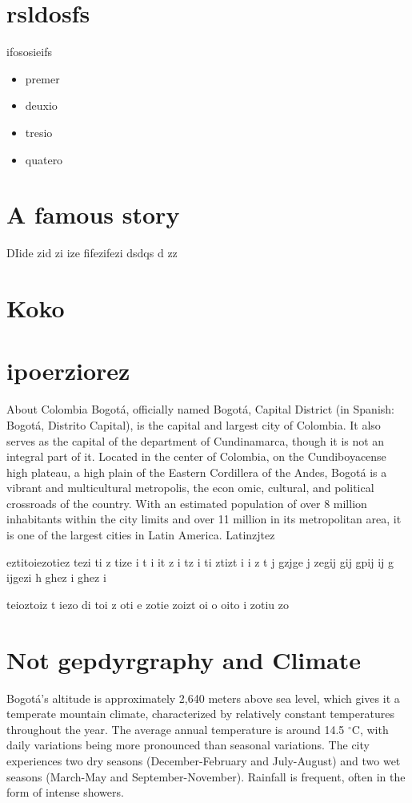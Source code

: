 \documentclass{article}
\begin{document}
\section{rsldosfs}

ifososieifs




\begin{itemize}
    \item premer
    \item deuxio
    \item tresio
    \item quatero
\end{itemize}

\section{A famous story}

DIide zid zi ize
fifezifezi
dsdqs
d
zz

\section{Koko}

\section{ipoerziorez}

About Colombia
Bogotá, officially named Bogotá, Capital District (in Spanish: Bogotá, Distrito Capital), is the capital and largest city of Colombia. It also serves as the capital of the department of Cundinamarca, though it is not an integral part of it. Located in the center of Colombia, on the Cundiboyacense high plateau, a high plain of the Eastern Cordillera of the Andes, Bogotá is a vibrant and multicultural metropolis, the econ
omic, cultural, and political crossroads of the country. With an estimated population of over 8 million inhabitants within the city limits and over 11 million in its metropolitan area, it is one of the largest cities in Latin America.
Latinzjtez

eztitoiezotiez
 tezi
 ti
z tize i
t i
it
z i
tz i
ti ztizt i
i z
t j
gzjge j
 zegij gij
 gpij
 ij
g
 ijgezi
h ghez
i ghez
i

teioztoiz t
iezo di
toi
z oti
e zotie zoizt oi
o
oito i
zotiu zo

\section{Not gepdyrgraphy and Climate}
Bogotá's altitude is approximately 2,640 meters above sea level, which gives it a temperate mountain climate, characterized by relatively constant temperatures throughout the year. The average annual temperature is around 14.5 $^\circ$C, with daily variations being more pronounced than seasonal variations. The city experiences two dry seasons (December-February and July-August) and two wet seasons (March-May and September-November). Rainfall is frequent, often in the form of intense showers.
\end{document}
